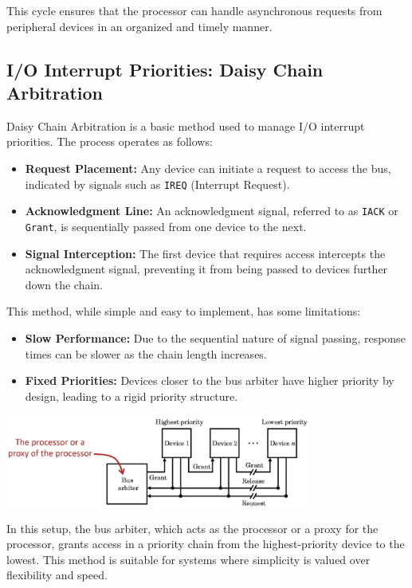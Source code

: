 This cycle ensures that the processor can handle asynchronous requests from peripheral devices in an organized and timely manner.
\newpage
\subsection{I/O Interrupt Priorities: Daisy Chain Arbitration}

Daisy Chain Arbitration is a basic method used to manage I/O interrupt priorities. The process operates as follows:

\begin{itemize}
    \item \textbf{Request Placement:} Any device can initiate a request to access the bus, indicated by signals such as \texttt{IREQ} (Interrupt Request).
    \item \textbf{Acknowledgment Line:} An acknowledgment signal, referred to as \texttt{IACK} or \texttt{Grant}, is sequentially passed from one device to the next.
    \item \textbf{Signal Interception:} The first device that requires access intercepts the acknowledgment signal, preventing it from being passed to devices further down the chain.
\end{itemize}

This method, while simple and easy to implement, has some limitations:
\begin{itemize}
    \item \textbf{Slow Performance:} Due to the sequential nature of signal passing, response times can be slower as the chain length increases.
    \item \textbf{Fixed Priorities:} Devices closer to the bus arbiter have higher priority by design, leading to a rigid priority structure.
\end{itemize}

\begin{center}
    \includegraphics[width=0.75\textwidth]{chapters/chapter2c/images/bus_arbiter.png}
\end{center}

In this setup, the bus arbiter, which acts as the processor or a proxy for the processor, grants access in a priority chain from the highest-priority device to the lowest. This method is suitable for systems where simplicity is valued over flexibility and speed.

